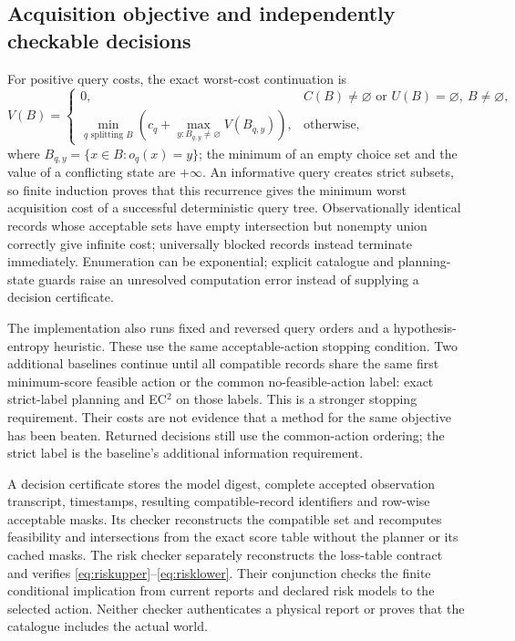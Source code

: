 \documentclass[11pt,a4paper]{article}
\theoremstyle{definition}\newtheorem{definition}[theorem]{Definition}
\begin{document}
\subsection{Acquisition objective and independently checkable decisions}
For positive query costs, the exact worst-cost continuation is
\begin{equation}
 V(B)=\begin{cases}
 0,&C(B)\ne\varnothing\text{ or }U(B)=\varnothing,\ B\ne\varnothing,\\
 \displaystyle\min_{q\text{ splitting }B}
 \left(c_q+\max_{y:B_{q,y}\ne\varnothing}V(B_{q,y})\right),&\text{otherwise},
 \end{cases}
 \label{eq:regionbellman}
\end{equation}
where $B_{q,y}=\{x\in B:o_q(x)=y\}$; the minimum of an empty choice set and the value of a conflicting state are $+\infty$. An informative query creates strict subsets, so finite induction proves that this recurrence gives the minimum worst acquisition cost of a successful deterministic query tree. Observationally identical records whose acceptable sets have empty intersection but nonempty union correctly give infinite cost; universally blocked records instead terminate immediately. Enumeration can be exponential; explicit catalogue and planning-state guards raise an unresolved computation error instead of supplying a decision certificate.

The implementation also runs fixed and reversed query orders and a hypothesis-entropy heuristic. These use the same acceptable-action stopping condition. Two additional baselines continue until all compatible records share the same first minimum-score feasible action or the common no-feasible-action label: exact strict-label planning and EC$^2$ on those labels. This is a stronger stopping requirement. Their costs are not evidence that a method for the same objective has been beaten. Returned decisions still use the common-action ordering; the strict label is the baseline's additional information requirement.

A decision certificate stores the model digest, complete accepted observation transcript, timestamps, resulting compatible-record identifiers and row-wise acceptable masks. Its checker reconstructs the compatible set and recomputes feasibility and intersections from the exact score table without the planner or its cached masks. The risk checker separately reconstructs the loss-table contract and verifies \eqref{eq:riskupper}--\eqref{eq:risklower}. Their conjunction checks the finite conditional implication from current reports and declared risk models to the selected action. Neither checker authenticates a physical report or proves that the catalogue includes the actual world.
\end{document}
